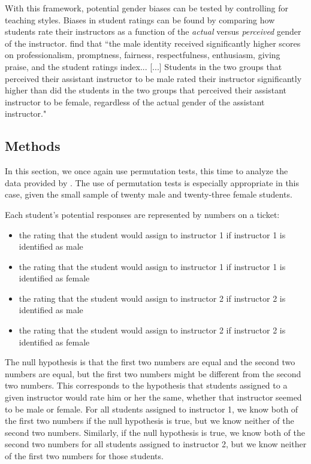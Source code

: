 \documentclass[12pt]{article}
\begin{document}
With this framework, potential gender biases can be tested by controlling for teaching styles. Biases in student ratings can be found by comparing how students rate their instructors as a function of the \textit{actual} versus \textit{perceived} gender of the instructor. \citet{MacNell2014} find that ``the male identity received significantly higher scores on professionalism, promptness, fairness, respectfulness, enthusiasm, giving praise, and the
student ratings index... [...] Students in the two groups that perceived their assistant
instructor to be male rated their instructor significantly higher than did the students in the
two groups that perceived their assistant instructor to be female, regardless of the actual gender
of the assistant instructor." 


\subsection{Methods}\label{macnell:methods}
In this section, we once again use permutation tests, this time to analyze the data provided by \citet{MacNell2014}. The use of permutation tests is especially appropriate in this case, given the small sample of twenty male and twenty-three female students.

Each student's potential responses are represented by numbers on a ticket:
\begin{itemize}
\item the rating that the student would assign to instructor 1 if instructor 1 is identified as male
\item the rating that the student would assign to instructor 1 if instructor 1 is identified as female
\item the rating that the student would assign to instructor 2 if instructor 2 is identified as male
\item the rating that the student would assign to instructor 2 if instructor 2 is identified as female
\end{itemize}

The null hypothesis is that the first two numbers are equal and the second two numbers are equal, but the first two numbers might be different from the second two numbers. This corresponds to the hypothesis that students assigned to a given instructor would rate him or her the same, whether that instructor seemed to be male or female. For all students assigned to instructor 1, we know both of the first two numbers if the null hypothesis is true, but we know neither of the second two numbers. Similarly, if the null hypothesis is true, we know both of the second two numbers for all students assigned to instructor 2, but we know neither of the first two numbers for those students. \\
\end{document}
